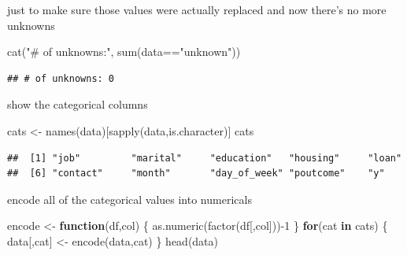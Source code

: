 \documentclass[
]{article}
\newenvironment{Shaded}{\begin{snugshade}}{\end{snugshade}}
\newcommand{\ControlFlowTok}[1]{\textcolor[rgb]{0.13,0.29,0.53}{\textbf{#1}}}
\newcommand{\DecValTok}[1]{\textcolor[rgb]{0.00,0.00,0.81}{#1}}
\newcommand{\FunctionTok}[1]{\textcolor[rgb]{0.00,0.00,0.00}{#1}}
\newcommand{\NormalTok}[1]{#1}
\newcommand{\OtherTok}[1]{\textcolor[rgb]{0.56,0.35,0.01}{#1}}
\newcommand{\SpecialCharTok}[1]{\textcolor[rgb]{0.00,0.00,0.00}{#1}}
\newcommand{\StringTok}[1]{\textcolor[rgb]{0.31,0.60,0.02}{#1}}
\begin{document}
just to make sure those values were actually replaced and now there's no
more unknowns

\begin{Shaded}
\begin{Highlighting}[]
\FunctionTok{cat}\NormalTok{(}\StringTok{"\# of unknowns:"}\NormalTok{, }\FunctionTok{sum}\NormalTok{(data}\SpecialCharTok{==}\StringTok{"unknown"}\NormalTok{))}
\end{Highlighting}
\end{Shaded}

\begin{verbatim}
## # of unknowns: 0
\end{verbatim}

show the categorical columns

\begin{Shaded}
\begin{Highlighting}[]
\NormalTok{cats }\OtherTok{\textless{}{-}} \FunctionTok{names}\NormalTok{(data)[}\FunctionTok{sapply}\NormalTok{(data,is.character)]}
\NormalTok{cats}
\end{Highlighting}
\end{Shaded}

\begin{verbatim}
##  [1] "job"         "marital"     "education"   "housing"     "loan"       
##  [6] "contact"     "month"       "day_of_week" "poutcome"    "y"
\end{verbatim}

encode all of the categorical values into numericals

\begin{Shaded}
\begin{Highlighting}[]
\NormalTok{encode }\OtherTok{\textless{}{-}} \ControlFlowTok{function}\NormalTok{(df,col) \{}
  \FunctionTok{as.numeric}\NormalTok{(}\FunctionTok{factor}\NormalTok{(df[,col]))}\SpecialCharTok{{-}}\DecValTok{1}
\NormalTok{\}}
\ControlFlowTok{for}\NormalTok{(cat }\ControlFlowTok{in}\NormalTok{ cats) \{}
\NormalTok{  data[,cat] }\OtherTok{\textless{}{-}} \FunctionTok{encode}\NormalTok{(data,cat)}
\NormalTok{\}}
\FunctionTok{head}\NormalTok{(data)}
\end{Highlighting}
\end{Shaded}
\end{document}
